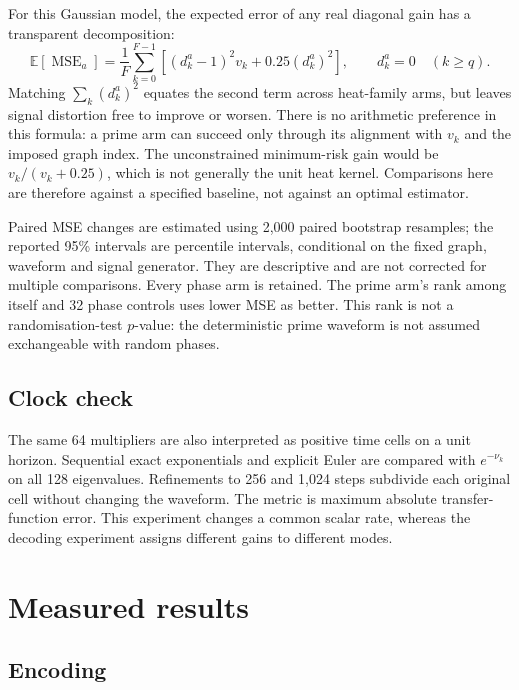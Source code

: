 \documentclass[10pt]{article}
\newcommand{\E}{\mathbb{E}}
\newcommand{\MSE}{\operatorname{MSE}}
\begin{document}
For this Gaussian model, the expected error of any real diagonal gain
has a transparent decomposition:
\begin{equation}
 \E[\MSE_a]=\frac1F\sum_{k=0}^{F-1}
       \left[(d_k^a-1)^2v_k+0.25(d_k^a)^2\right],
 \qquad d_k^a=0\quad(k\geq q).
 \label{eq:risk}
\end{equation}
Matching $\sum_k(d_k^a)^2$ equates the second term across heat-family
arms, but leaves signal distortion free to improve or worsen.
There is no arithmetic preference in this formula: a prime arm can
succeed only through its alignment with $v_k$ and the imposed graph
index. The unconstrained minimum-risk gain would be
$v_k/(v_k+0.25)$, which is not generally the unit heat kernel.
Comparisons here are therefore against a specified baseline, not
against an optimal estimator.

Paired MSE changes are estimated using 2,000 paired bootstrap resamples;
the reported 95\% intervals are percentile intervals, conditional on
the fixed graph, waveform and signal generator. They are descriptive
and are not corrected for multiple comparisons. Every phase arm is
retained. The prime arm's rank among itself and 32 phase controls uses
lower MSE as better. This rank is not a randomisation-test $p$-value:
the deterministic prime waveform is not assumed exchangeable with
random phases.

\subsection{Clock check}

The same 64 multipliers are also interpreted as positive time cells
on a unit horizon. Sequential exact exponentials and explicit Euler
are compared with $e^{-\nu_k}$ on all 128 eigenvalues. Refinements
to 256 and 1,024 steps subdivide each original cell without changing
the waveform. The metric is maximum absolute transfer-function error.
This experiment changes a common scalar rate, whereas the decoding
experiment assigns different gains to different modes.

\section{Measured results}
\label{sec:results}

\subsection{Encoding}
\end{document}
